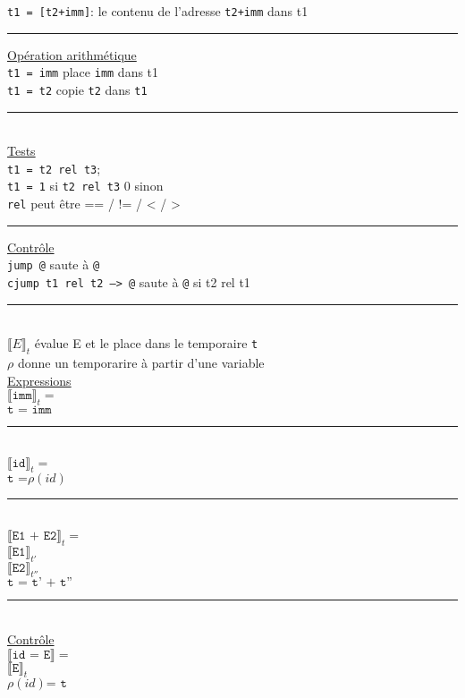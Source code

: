 \documentclass[12pt,twocolumn]{report}
\begin{document}
\texttt{t1 = [t2+imm]}: le contenu de l'adresse \texttt{t2+imm} dans t1\\
\rule{9cm}{0.1pt}
    \underline{Opération arithmétique}\\
    \texttt{t1 = imm} place \verb|imm| dans t1\\
    \texttt{t1 = t2} copie \verb|t2| dans \verb|t1|\\
\rule{9cm}{0.1pt}\\
    \underline{Tests}\\
    \texttt{t1 = t2 rel t3}; \\
    \verb|t1 = 1| si \texttt{t2 rel t3} 0 sinon\\
    \texttt{rel} peut être == / != / < / >\\
\rule{9cm}{0.1pt}
    \underline{Contrôle}\\
    \texttt{jump @} saute à \verb|@|\\
    \texttt{cjump t1 rel t2 --> @} saute à \verb|@| si t2 rel t1\\
\rule{9cm}{0.1pt}\\
$\llbracket E \rrbracket_t$ évalue E et le place dans le temporaire \verb|t|\\
$\rho$ donne un temporarire à partir d'une variable\\
    \underline{Expressions}\\
    $\llbracket \texttt{imm} \rrbracket_t = $\\
    \hphantom{aa}$\texttt{t = imm}$\\
    \rule{3cm}{0.1pt}\\
    $\llbracket \texttt{id} \rrbracket_t = $\\
    \hphantom{aa}$\texttt{t =} \rho(id)$\\
    \rule{3cm}{0.1pt}\\
    $\llbracket \texttt{E1 + E2} \rrbracket_t = $\\
    \hphantom{aa}$\llbracket \texttt{E1} \rrbracket_{t'}$\\
    \hphantom{aa}$\llbracket \texttt{E2} \rrbracket_{t''}$ \\
    \hphantom{aa}$\texttt{t = t' + t''}$\\
\rule{9cm}{0.1pt}\\
    \underline{Contrôle}\\
    $\llbracket \texttt{id = E} \rrbracket= $\\
    \hphantom{aa}$\llbracket \texttt{E} \rrbracket_{t} $\\
    \hphantom{aa}$\rho(id) \texttt{= t} $\\
\end{document}
